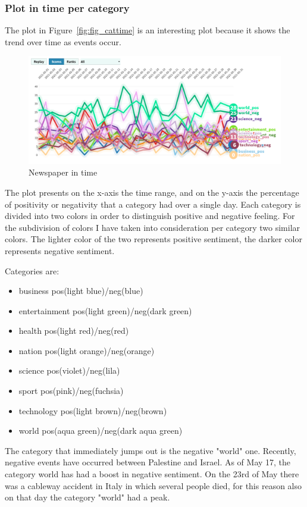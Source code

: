 \subsubsection{Plot in time per category}
The \gls{plot} in Figure~\ref{fig:fig_cattime} is an interesting \gls{plot} because it shows the trend over time as events occur.

\begin{figure}[H]
 \includegraphics[width=1.2\textwidth,center]{images/CategoryPOSneg.png}
\caption{Newspaper in time}
\label{fig:fig_timenews}
\end{figure}
\FloatBarrier

The \gls{plot} presents on the x-axis the time range, and on the y-axis the percentage of positivity or negativity that a category had over a single day.
Each category is divided into two colors in order to distinguish positive and negative feeling. For the subdivision of colors I have taken into consideration per category two similar colors. The lighter color of the two represents positive sentiment, the darker color represents negative sentiment.

Categories are:
\begin{itemize}
    \item business pos(light blue)/neg(blue)
    \item entertainment pos(light green)/neg(dark green)
    \item health pos(light red)/neg(red)
    \item nation pos(light orange)/neg(orange)
    \item science pos(violet)/neg(lila)
    \item sport pos(pink)/neg(fuchsia)
    \item technology pos(light brown)/neg(brown)
    \item world pos(aqua green)/neg(dark aqua green)
\end{itemize}

The category that immediately jumps out is the negative "world" one.
Recently, negative events have occurred between Palestine and Israel. As of May 17, the category world has had a boost in negative sentiment. On the 23rd of May there was a cableway accident in Italy in which several people died, for this reason also on that day the category "world" had a peak.


